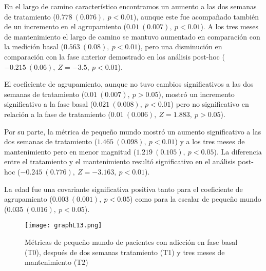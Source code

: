 En el largo de camino característico encontramos un aumento a las dos semanas de tratamiento ($0.778\ (0.076),\ p<0.01$), aunque este fue acompañado también de un incremento en el agrupamiento ($0.01\ (0.007),\ p<0.01$). A los tres meses de mantenimiento el largo de camino se mantuvo aumentado en comparación con la medición basal ($0.563\ (0.08),\ p<0.01$), pero una disminución en comparación con la fase anterior demostrado en los análisis post-hoc ($-0.215\ (0.06),\ Z=-3.5,\ p<0.01$). \par
El coeficiente de agrupamiento, aunque no tuvo cambios significativos a las dos semanas de tratamiento ($0.01\ (0.007),\ p>0.05$), mostró un incremento significativo a la fase basal ($0.021\ (0.008),\ p<0.01$) pero no significativo en relación a la fase de tratamiento ($0.01\ (0.006),\ Z=1.883,\ p>0.05$).\par
Por su parte, la métrica de pequeño mundo mostró un aumento significativo a las dos semanas de tratamiento ($1.465\ (0.098),\ p<0.01$) y a los tres meses de mantenimiento pero en menor magnitud ($1.219\ (0.105),\ p<0.05$). La diferencia entre el tratamiento y el mantenimiento resultó significativo en el análisis post-hoc ($-0.245\ (0.776),\ Z=-3.163,\ p<0.01$). \par
La edad fue una covariante significativa positiva tanto para el coeficiente de agrupamiento ($0.003\ (0.001),\ p<0.05$) como para la escalar de pequeño mundo ($0.035\ (0.016),\ p<0.05$).

\begin{figure}[!htb]
    \centering
    \texttt{[image: graphL13.png]}
    \caption{Métricas de pequeño mundo de pacientes con adicción en fase basal (T0), después de dos semanas tratamiento (T1) y tres meses de mantenimiento (T2)}
    \label{fig:gpL13}
\end{figure}


